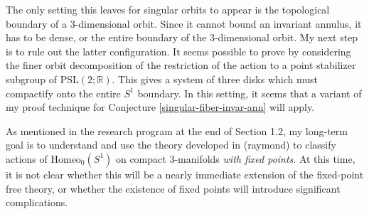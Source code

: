 \documentclass[10pt, oneside]{article}
\newcommand{\R}{\mathbb{R}}
\theoremstyle{definition}
\theoremstyle{definition}
\begin{document}
The only setting this leaves for singular orbits to appear is the topological boundary of a 3-dimensional orbit. Since it cannot bound an invariant annulus, it has to be dense, or the entire boundary of the 3-dimensional orbit. My next step is to rule out the latter configuration. It seems possible to prove by considering the finer orbit decomposition of the restriction of the action to a point stabilizer subgroup of $\text{PSL}(2;\R)$. This gives a system of three disks which must compactify onto the entire $S^1$ boundary. In this setting, it seems that a variant of my proof technique for Conjecture \ref{singular-fiber-invar-ann} will apply.

As mentioned in the research program at the end of Section 1.2, my long-term goal is to understand and use the theory developed in \cite{raymond} (raymond) to classify actions of $\text{Homeo}_0(S^1)$ on compact 3-manifolds {\it with fixed points}. At this time, it is not clear whether this will be a nearly immediate extension of the fixed-point free theory, or whether the existence of fixed points will introduce significant complications.
\end{document}
